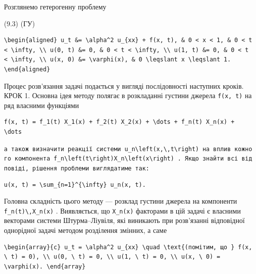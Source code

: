 \documentclass[
  ukrainian,
]{article}
\begin{document}
Розглянемо гетерогенну проблему

(9.3) (ГУ)

\begin{verbatim}
\begin{aligned} u_t &= \alpha^2 u_{xx} + f(x, t), & 0 < x < 1, & 0 < t < \infty, \\ u(0, t) &= 0, & 0 < t < \infty, \\ u(1, t) &= 0, & 0 < t < \infty, \\ u(x, 0) &= \varphi(x), & 0 \leqslant x \leqslant 1. \end{aligned}
\end{verbatim}

Процес розв'язання задачі подається у вигляді послідовності наступних
кроків. КРОК 1. Основна ідея методу полягає в розкладанні густини
джерела \texttt{f(x,\ t)} на ряд власними функціями

\begin{verbatim}
f(x, t) = f_1(t) X_1(x) + f_2(t) X_2(x) + \dots + f_n(t) X_n(x) + \dots
\end{verbatim}

\texttt{а\ також\ визначити\ реакції\ системи\ \textquotesingle{}u\_n\textbackslash{}left(x,\textbackslash{},t\textbackslash{}right)\textquotesingle{}\ на\ вплив\ кожного\ компонента\ \textquotesingle{}f\_n\textbackslash{}left(t\textbackslash{}right)X\_n\textbackslash{}left(x\textbackslash{}right)\textquotesingle{}\ .\ Якщо\ знайти\ всі\ відповіді,\ рішення\ проблеми\ виглядатиме\ так:}

\begin{verbatim}
u(x, t) = \sum_{n=1}^{\infty} u_n(x, t).
\end{verbatim}

Головна складність цього методу --- розклад густини джерела на
компоненти \texttt{f\_n(t)\textbackslash{},X\_n(x)} . Виявляється, що
\texttt{X\_n(x)} факторами в цій задачі є власними векторами системи
Штурма--Ліувіля, які виникають при розв'язанні відповідної однорідної
задачі методом розділення змінних, а саме

\begin{verbatim}
\begin{array}{c} u_t = \alpha^2 u_{xx} \quad \text{(помітим, що } f(x, \ t) = 0), \\ u(0, \ t) = 0, \\ u(1, \ t) = 0, \\ u(x, \ 0) = \varphi(x). \end{array}
\end{verbatim}
\end{document}
